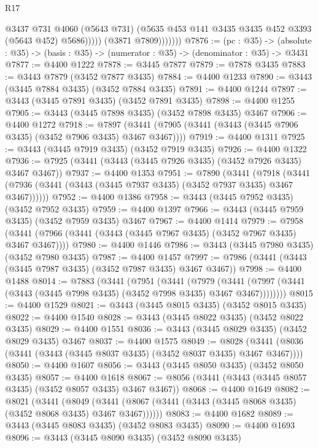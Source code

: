 \begin{lexlean}{R17}
\begin{coremodule}
                        @3437
                        @731
                        @4060
                        (@5643 @731)
                        (@5635 @453 @141 @3435 @3435 @452 @3393 (@5643 @452) @5686)))))
                (@3871 @7809)))))))
@7876 := (pc : @35) ->
  (absolute : @35) -> (basis : @35) -> (numerator : @35) -> (denominator : @35) -> @3431
@7877 := @4400 @1222
@7878 := @3445 @7877
@7879 := @7878 @3435
@7883 := @3443 @7879 (@3452 @7877 @3435)
@7884 := @4400 @1233
@7890 := @3443 (@3445 @7884 @3435) (@3452 @7884 @3435)
@7891 := @4400 @1244
@7897 := @3443 (@3445 @7891 @3435) (@3452 @7891 @3435)
@7898 := @4400 @1255
@7905 := @3443 (@3445 @7898 @3435) (@3452 @7898 @3435) @3467
@7906 := @4400 @1272
@7918 := @7897 (@3441 (@7905 (@3441 (@3443 (@3445 @7906 @3435) (@3452 @7906 @3435) @3467 @3467))))
@7919 := @4400 @1311
@7925 := @3443 (@3445 @7919 @3435) (@3452 @7919 @3435)
@7926 := @4400 @1322
@7936 := @7925 (@3441 (@3443 (@3445 @7926 @3435) (@3452 @7926 @3435) @3467 @3467))
@7937 := @4400 @1353
@7951 := @7890
    (@3441
      (@7918 (@3441 (@7936 (@3441 (@3443 (@3445 @7937 @3435) (@3452 @7937 @3435) @3467 @3467))))))
@7952 := @4400 @1386
@7958 := @3443 (@3445 @7952 @3435) (@3452 @7952 @3435)
@7959 := @4400 @1397
@7966 := @3443 (@3445 @7959 @3435) (@3452 @7959 @3435) @3467
@7967 := @4400 @1414
@7979 := @7958 (@3441 (@7966 (@3441 (@3443 (@3445 @7967 @3435) (@3452 @7967 @3435) @3467 @3467))))
@7980 := @4400 @1446
@7986 := @3443 (@3445 @7980 @3435) (@3452 @7980 @3435)
@7987 := @4400 @1457
@7997 := @7986 (@3441 (@3443 (@3445 @7987 @3435) (@3452 @7987 @3435) @3467 @3467))
@7998 := @4400 @1488
@8014 := @7883
    (@3441
      (@7951
        (@3441
          (@7979
            (@3441 (@7997 (@3441 (@3443 (@3445 @7998 @3435) (@3452 @7998 @3435) @3467 @3467))))))))
@8015 := @4400 @1529
@8021 := @3443 (@3445 @8015 @3435) (@3452 @8015 @3435)
@8022 := @4400 @1540
@8028 := @3443 (@3445 @8022 @3435) (@3452 @8022 @3435)
@8029 := @4400 @1551
@8036 := @3443 (@3445 @8029 @3435) (@3452 @8029 @3435) @3467
@8037 := @4400 @1575
@8049 := @8028 (@3441 (@8036 (@3441 (@3443 (@3445 @8037 @3435) (@3452 @8037 @3435) @3467 @3467))))
@8050 := @4400 @1607
@8056 := @3443 (@3445 @8050 @3435) (@3452 @8050 @3435)
@8057 := @4400 @1618
@8067 := @8056 (@3441 (@3443 (@3445 @8057 @3435) (@3452 @8057 @3435) @3467 @3467))
@8068 := @4400 @1649
@8082 := @8021
    (@3441
      (@8049 (@3441 (@8067 (@3441 (@3443 (@3445 @8068 @3435) (@3452 @8068 @3435) @3467 @3467))))))
@8083 := @4400 @1682
@8089 := @3443 (@3445 @8083 @3435) (@3452 @8083 @3435)
@8090 := @4400 @1693
@8096 := @3443 (@3445 @8090 @3435) (@3452 @8090 @3435)

\end{coremodule}
\end{lexlean}
